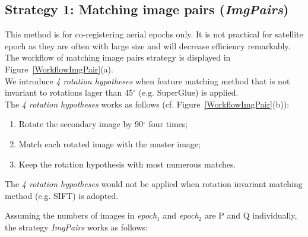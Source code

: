 \subsection{Strategy 1: Matching image pairs (\textit{ImgPairs})}
This method is for co-registering aerial epochs only. It is not practical for satellite epoch as they are often with large size and will decrease efficiency remarkably.\\
The workflow of matching image pairs strategy is displayed in Figure~\ref{WorkflowImgPair}(a).\\
We introduce \textit{4 rotation hypotheses} when feature matching method that is not invariant to rotations lager than 45$^\circ$ (e.g. SuperGlue) is applied.\\
The \textit{4 rotation hypotheses} works as follows (cf. Figure~\ref{WorkflowImgPair}(b)): 
\begin{enumerate}
    \item Rotate the secondary image by 90$^{\circ}$ four times;
    \item Match each rotated image with the master image;
    \item Keep the rotation hypothesis with most numerous matches.
\end{enumerate}
The \textit{4 rotation hypotheses} would not be applied when rotation invariant matching method (e.g. SIFT) is adopted.
\par
Assuming the numbers of images in \textit{epoch$_1$} and \textit{epoch$_2$} are P and Q individually, the strategy \textit{ImgPairs} works as follows:\\
